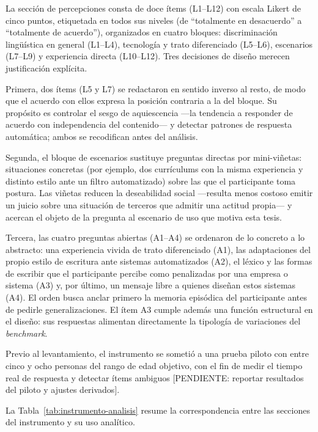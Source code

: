 La sección de percepciones consta de doce ítems (L1--L12) con escala Likert de
cinco puntos, etiquetada en todos sus niveles (de ``totalmente en desacuerdo''
a ``totalmente de acuerdo''), organizados en cuatro bloques: discriminación
lingüística en general (L1--L4), tecnología y trato diferenciado (L5--L6),
escenarios (L7--L9) y experiencia directa (L10--L12). Tres decisiones de
diseño merecen justificación explícita.

Primera, dos ítems (L5 y L7) se redactaron en sentido inverso al resto, de
modo que el acuerdo con ellos expresa la posición contraria a la del bloque.
Su propósito es controlar el sesgo de aquiescencia ---la tendencia a responder
de acuerdo con independencia del contenido--- y detectar patrones de respuesta
automática; ambos se recodifican antes del análisis.

Segunda, el bloque de escenarios sustituye preguntas directas por
mini-viñetas: situaciones concretas (por ejemplo, dos currículums con la misma
experiencia y distinto estilo ante un filtro automatizado) sobre las que el
participante toma postura. Las viñetas reducen la deseabilidad social
---resulta menos costoso emitir un juicio sobre una situación de terceros que
admitir una actitud propia--- y acercan el objeto de la pregunta al escenario
de uso que motiva esta tesis.

Tercera, las cuatro preguntas abiertas (A1--A4) se ordenaron de lo concreto a
lo abstracto: una experiencia vivida de trato diferenciado (A1), las
adaptaciones del propio estilo de escritura ante sistemas automatizados (A2),
el léxico y las formas de escribir que el participante percibe como
penalizadas por una empresa o sistema (A3) y, por último, un mensaje libre a
quienes diseñan estos sistemas (A4). El orden busca anclar primero la memoria
episódica del participante antes de pedirle generalizaciones. El ítem A3
cumple además una función estructural en el diseño: sus respuestas alimentan
directamente la tipología de variaciones del \emph{benchmark}.

Previo al levantamiento, el instrumento se sometió a una prueba piloto con
entre cinco y ocho personas del rango de edad objetivo, con el fin de medir el
tiempo real de respuesta y detectar ítems ambiguos
[PENDIENTE: reportar resultados del piloto y ajustes derivados].

La Tabla~\ref{tab:instrumento-analisis} resume la correspondencia entre las
secciones del instrumento y su uso analítico.

